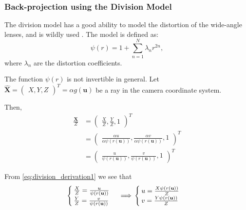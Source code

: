 \subsubsection{Back-projection using the Division Model}\label{subsub:back_projection_using_the_division_model}

The division model has a good ability to model the distortion of the wide-angle
lenses, and is wildly used \citep{prittsMinimalSolversRectifying2021,
scaramuzzaFlexibleTechniqueAccurate2006}. The model is defined as:
\begin{equation}
	\psi(r) = 1 + \sum_{n = 1}^{N} \lambda_n r^{2n},
\end{equation}
where \(\lambda_n\) are the distortion coefficients.

The function \(\psi(r)\) is not invertible in general.
Let \(\mathbf{\widehat{X}} = \begin{pmatrix}
	X, Y, Z
\end{pmatrix}^{T} = \alpha g(\mathbf{u})\) be a ray in the camera coordinate system.

Then,
\begin{align}
	\frac{\mathbf{X}}{Z} & =
	\begin{pmatrix}
		\frac{X}{Z}, \frac{Y}{Z}, 1
	\end{pmatrix}^{T}                               \\                                 & =
	\begin{pmatrix}
		\frac{\alpha u}{\alpha \psi(r(\mathbf{u}))},
		\frac{\alpha v}{\alpha \psi(r(\mathbf{u}))},
		1
	\end{pmatrix}^{T}  \\
	                     & = \label{eq:division_derivation1}
	\begin{pmatrix}
		\frac{u}{\psi(r(\mathbf{u}))},
		\frac{v}{\psi(r(\mathbf{u}))},
		1
	\end{pmatrix}^{T}
\end{align}

From \ref{eq:division_derivation1} we see that
\begin{equation} \label{eq:division_derivation2}
	\begin{cases}
		\frac{X}{Z} = \frac{u}{\psi(r(\mathbf{u}))} \\
		\frac{Y}{Z} = \frac{v}{\psi(r(\mathbf{u}))}
	\end{cases} \implies \\
	\begin{cases}
		u = \frac{X \psi(r(\mathbf{u}))}{Z} \\
		v = \frac{Y \psi(r(\mathbf{u}))}{Z}
	\end{cases}
\end{equation}


